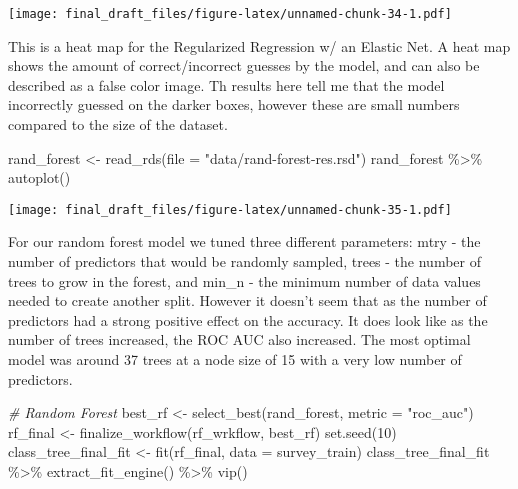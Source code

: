 \documentclass[
]{article}
\newenvironment{Shaded}{\begin{snugshade}}{\end{snugshade}}
\newcommand{\AttributeTok}[1]{\textcolor[rgb]{0.77,0.63,0.00}{#1}}
\newcommand{\CommentTok}[1]{\textcolor[rgb]{0.56,0.35,0.01}{\textit{#1}}}
\newcommand{\DecValTok}[1]{\textcolor[rgb]{0.00,0.00,0.81}{#1}}
\newcommand{\FunctionTok}[1]{\textcolor[rgb]{0.00,0.00,0.00}{#1}}
\newcommand{\NormalTok}[1]{#1}
\newcommand{\OtherTok}[1]{\textcolor[rgb]{0.56,0.35,0.01}{#1}}
\newcommand{\SpecialCharTok}[1]{\textcolor[rgb]{0.00,0.00,0.00}{#1}}
\newcommand{\StringTok}[1]{\textcolor[rgb]{0.31,0.60,0.02}{#1}}
\begin{document}
\texttt{[image: final\_draft\_files/figure-latex/unnamed-chunk-34-1.pdf]}

This is a heat map for the Regularized Regression w/ an Elastic Net. A
heat map shows the amount of correct/incorrect guesses by the model, and
can also be described as a false color image. Th results here tell me
that the model incorrectly guessed on the darker boxes, however these
are small numbers compared to the size of the dataset.

\begin{Shaded}
\begin{Highlighting}[]
\NormalTok{rand\_forest }\OtherTok{\textless{}{-}} \FunctionTok{read\_rds}\NormalTok{(}\AttributeTok{file =} \StringTok{"data/rand{-}forest{-}res.rsd"}\NormalTok{)}
\NormalTok{rand\_forest }\SpecialCharTok{\%\textgreater{}\%}
  \FunctionTok{autoplot}\NormalTok{()}
\end{Highlighting}
\end{Shaded}

\texttt{[image: final\_draft\_files/figure-latex/unnamed-chunk-35-1.pdf]}

For our random forest model we tuned three different parameters: mtry -
the number of predictors that would be randomly sampled, trees - the
number of trees to grow in the forest, and min\_n - the minimum number
of data values needed to create another split. However it doesn't seem
that as the number of predictors had a strong positive effect on the
accuracy. It does look like as the number of trees increased, the ROC
AUC also increased. The most optimal model was around 37 trees at a node
size of 15 with a very low number of predictors.

\begin{Shaded}
\begin{Highlighting}[]
\CommentTok{\# Random Forest}
\NormalTok{best\_rf }\OtherTok{\textless{}{-}} \FunctionTok{select\_best}\NormalTok{(rand\_forest, }\AttributeTok{metric =} \StringTok{"roc\_auc"}\NormalTok{)}
\NormalTok{rf\_final }\OtherTok{\textless{}{-}} \FunctionTok{finalize\_workflow}\NormalTok{(rf\_wrkflow, best\_rf)}
\FunctionTok{set.seed}\NormalTok{(}\DecValTok{10}\NormalTok{)}
\NormalTok{class\_tree\_final\_fit }\OtherTok{\textless{}{-}} \FunctionTok{fit}\NormalTok{(rf\_final, }\AttributeTok{data =}\NormalTok{ survey\_train)}
\NormalTok{class\_tree\_final\_fit }\SpecialCharTok{\%\textgreater{}\%}
  \FunctionTok{extract\_fit\_engine}\NormalTok{() }\SpecialCharTok{\%\textgreater{}\%}
  \FunctionTok{vip}\NormalTok{()}
\end{Highlighting}
\end{Shaded}
\end{document}
